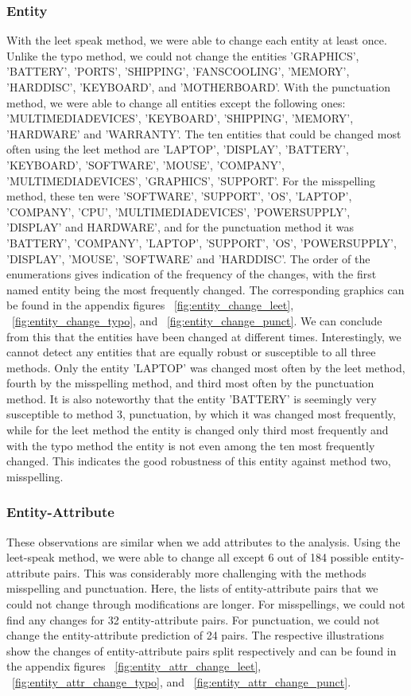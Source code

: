 \subsubsection{Entity}
With the leet speak method, we were able to change each entity at least once. Unlike the typo method, we could not change the entities 'GRAPHICS', 'BATTERY', 'PORTS', 'SHIPPING', 'FANS\textunderscore COOLING', 'MEMORY', 'HARD\textunderscore DISC', 'KEYBOARD', and 'MOTHERBOARD'. With the punctuation method, we were able to change all entities except the following ones: 'MULTIMEDIA\textunderscore DEVICES', 'KEYBOARD', 'SHIPPING', 'MEMORY', 'HARDWARE' and 'WARRANTY'. 
The ten entities that could be changed most often using the leet method are 'LAPTOP', 'DISPLAY', 'BATTERY', 'KEYBOARD', 'SOFTWARE', 'MOUSE', 'COMPANY', 'MULTIMEDIA\textunderscore DEVICES', 'GRAPHICS', 'SUPPORT'. For the misspelling method, these ten were 'SOFTWARE', 'SUPPORT', 'OS', 'LAPTOP', 'COMPANY', 'CPU', 'MULTIMEDIA\textunderscore DEVICES', 'POWER\textunderscore SUPPLY', 'DISPLAY' and HARDWARE', and for the punctuation method it was 'BATTERY', 'COMPANY', 'LAPTOP', 'SUPPORT', 'OS', 'POWER\textunderscore SUPPLY', 'DISPLAY', 'MOUSE', 'SOFTWARE' and 'HARD\textunderscore DISC'. The order of the enumerations gives indication of the frequency of the changes, with the first named entity being the most frequently changed. The corresponding graphics can be found in the appendix figures ~\ref{fig:entity_change_leet}, ~\ref{fig:entity_change_typo}, and ~\ref{fig:entity_change_punct}. 
We can conclude from this that the entities have been changed at different times.  Interestingly, we cannot detect any entities that are equally robust or susceptible to all three methods. Only the entity 'LAPTOP' was changed most often by the leet method, fourth by the misspelling method, and third most often by the punctuation method. It is also noteworthy that the entity 'BATTERY' is seemingly very susceptible to method 3, punctuation, by which it was changed most frequently, while for the leet method the entity is changed only third most frequently and with the typo method the entity is not even among the ten most frequently changed. This indicates the good robustness of this entity against method two, misspelling. 

\subsubsection{Entity-Attribute}
These observations are similar when we add attributes to the analysis. Using the leet-speak method, we were able to change all except 6 out of 184 possible entity-attribute pairs. This was considerably more challenging with the methods misspelling and punctuation. Here, the lists of entity-attribute pairs that we could not change through modifications are longer. For misspellings, we could not find any changes for 32 entity-attribute pairs. For punctuation, we could not change the entity-attribute prediction of 24 pairs. The respective illustrations show the changes of entity-attribute pairs split respectively and can be found in the appendix figures ~\ref{fig:entity_attr_change_leet}, ~\ref{fig:entity_attr_change_typo}, and ~\ref{fig:entity_attr_change_punct}.

